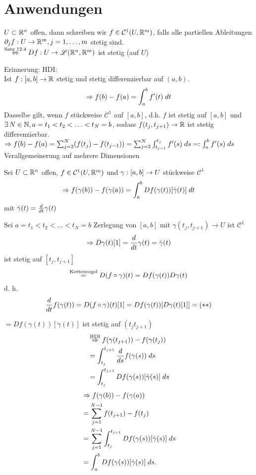 \documentclass[../ana2.tex]{subfiles}
\begin{document}
\setcounter{section}{12}
\section{Anwendungen}
\begin{notation}
    \( U \subset \R^n \) offen, 
    dann schreiben wir \(f \in \mathcal{C}^1(U, \R^m)\), 
    falls alle partiellen Ableitungen \( \abb{\partial_jf}{U}{\R^m}, 
    j = 1,\ldots, m \) stetig sind.\\
    \( \oversett{Satz 12.4}{\Leftrightarrow} 
    \abb{Df}{U}{\mathscr{L}(\R^n, \R^m)} \) 
    ist stetig (auf \(U\))
\end{notation}
Erinnerung: HDI: \\
Ist \( \abb{f}{[a,b]}{\R} \) stetig und stetig differenzierbar
auf \((a,b)\).
\[ \Rightarrow f(b)-f(a) = \integralx{f'(t)}{a}{b}{t} \]
Dasselbe gilt, wenn \(f\) stückweise \(\mathcal{C}^1\)
auf \([a,b]\), d.h. \(f\) ist stetig auf \([a,b]\) und
\( \exists N \in \N, a = t_1 < t_2 < \ldots < t_N = b \),
sodass \( f(t_j, t_{j+1}) \rightarrow \R \) ist stetig 
differenzierbar.\\
\( \Rightarrow f(b)- f(a) = \sum_{j=2}^N (f(t_j) - f(t_{j-1}))
= \sum_{j=2}^N \integralx{f'(s)}{t_{j-1}}{t_j}{s} 
=: \integralx{f'(s)}{a}{b}{s} \)\\
Verallgemeinerung auf mehrere Dimensionen
\begin{lem}
    Sei \(U \subset \R^n\) offen, \( f \in \mathcal{C}^1(U, \R^m) \) 
    und \( \abb{\gamma}{[a,b]}{U} \) stückweise \(\mathcal{C}^1\)
    \[ \Rightarrow f(\gamma(b)) - f(\gamma(a)) 
    = \integralx{Df(\gamma(t))[\dot{\gamma}(t)]}{a}{b}{t} \]
    mit \(\dot{\gamma}(t) = \ddx{t} \gamma(t)\)
\end{lem}
\begin{bew}
    Sei \( a = t_1 < t_2 < \dots < t_N = b \) Zerlegung von 
    \( [a,b] \) mit \( \gamma(t_j, t_{j+1}) \rightarrow U \) 
    ist \( \mathcal{C}^1 \)
    \[ \Rightarrow D \gamma(t)[1] = \ddx{t} \gamma(t) 
    = \dot{\gamma}(t) \]
    ist stetig auf \( [t_j, t_{j+1}] \)
    \[ \oversett{Kettenregel}{=} D(f\circ \gamma)(t)
    = Df(\gamma(t))D\gamma(t) \]
    d. h. 
    \[ \ddx{t} f(\gamma(t)) = D(f\circ\gamma)(t)[1] 
    = Df(\gamma(t))[D\gamma(t)[1]] = (**) \] 

    \( = Df(\gamma(t))[\dot{\gamma}(t)] \) ist stetig auf 
    \( (t_j t_{j+1}) \)
    \begin{align*}
        &\oversett{HDI}{\Rightarrow} f(\gamma(t_{j+1})) 
        - f(\gamma(t_j)) \\
        &= \integralx{\ddx{s}f(\gamma(s))}{t_j}{t_{j+1}}{s} \\
        &= \integralx{D f(\gamma(s))
        [\dot{\gamma}(s)]}{t_j}{t_{j+1}}{s} 
    \end{align*}
    \begin{align*}
        &\Rightarrow f(\gamma(b)) - f(\gamma(a)) \\
        &= \sum_{j=1}^{N-1} f(t_{j+1}) - f(t_j) \\
        &= \sum_{j=1}^{N-1} \integralx{Df(\gamma(s))[\dot{\gamma}(s)]}{t_j}{t_{j+1}}{s} \\
        &= \integralx{Df(\gamma(s))[\dot{\gamma}(s)]}{a}{b}{s}.
    \end{align*}
\end{bew}
\end{document}
